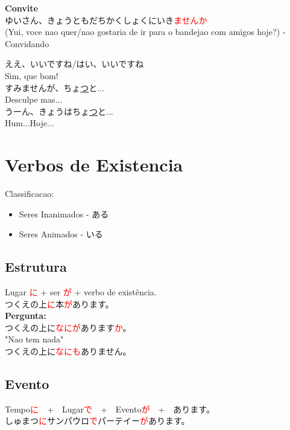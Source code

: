 \documentclass[a4paper, 12pt]{article}
\begin{document}
\begin{CJK}{UTF8}{min}
		\Large
		\textbf{Convite}\\
		\normalsize
		ゆいさん、きょうともだちかくしょくにいき\textcolor{red}{ませんか}\\
		(Yui, voce nao quer/nao gostaria de ir para o bandejao com
		amigos hoje?) - Convidando
		
		ええ、いいですね/はい、いいですね\\
		Sim, que bom!\\
		すみませんが、ちょ\underline{つ}と...\\
		Desculpe mas...\\
		うーん、きょうはちょ\underline{つ}と...\\
		Hum...Hoje...
	\end{CJK}
\newpage



\section{Verbos de Existencia}
\begin{CJK}{UTF8}{min}
	Classificacao:
	\begin{itemize}
		\item Seres Inanimados - ある
		\item Seres Animados - いる
	\end{itemize}
\end{CJK}
\subsection{Estrutura}
	\begin{CJK}{UTF8}{min}
		Lugar \textcolor{red}{に} + ser \textcolor{red}{が} + verbo de existência.\\
		つくえの上\textcolor{red}{に}本\textcolor{red}{が}あります。\\
		\textbf{Pergunta:}\\
		つくえの上に\textcolor{red}{なにが}あります\textcolor{red}{か}。\\
		"Nao tem nada"\\
		つくえの上に\textcolor{red}{なにも}ありません。\\
		
	\end{CJK}
\subsection{Evento}
	\begin{CJK}{UTF8}{min}
		Tempo\textcolor{red}{に}　+　Lugar\textcolor{red}{で}　+　Evento\textcolor{red}{が}　+　あります。\\
		しゅまつ\textcolor{red}{に}サンパウロ\textcolor{red}{で}パーテイー\textcolor{red}{が}あります。
	\end{CJK}
\end{document}

